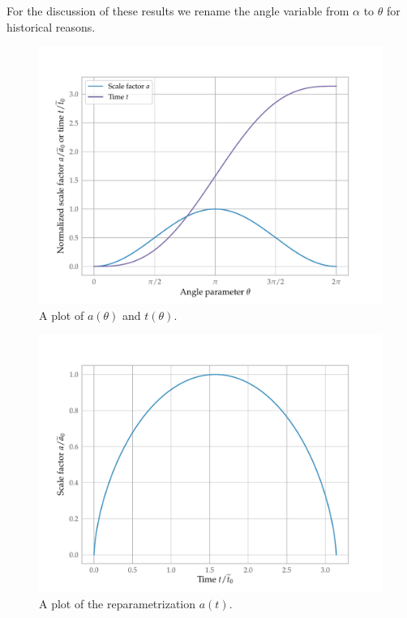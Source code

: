 \documentclass[main.tex]{subfiles}
\begin{document}
For the discussion of these results we rename the angle variable from \(\alpha \) to \(\theta \) for historical reasons. 
\begin{figure}[ht]
\centering
\includegraphics[width=\textwidth]{figures/positive_curvature_a.pdf}
\caption{A plot of \(a(\theta )\) and \(t(\theta )\).}
\label{fig:positive_curvature_a}
\end{figure}

\begin{figure}[ht]
\centering
\includegraphics[width=\textwidth]{figures/positive_curvature_a_vs_t.pdf}
\caption{A plot of the reparametrization \(a(t)\).}
\label{fig:positive_curvature_a_vs_t}
\end{figure}
\end{document}
